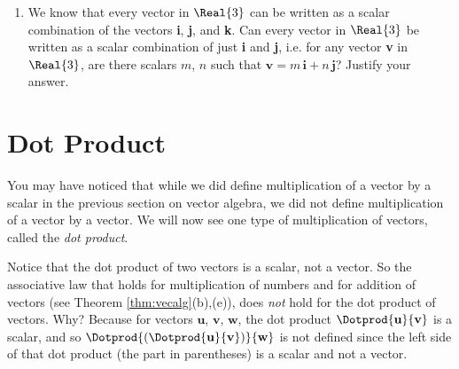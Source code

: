 \begin{enumerate}[\bfseries 1.]
[{[\bfseries 1.]}]
 \item We know that every vector in $\Real{3}$ can be written as a scalar combination of the vectors \textbf{i},
 \textbf{j}, and \textbf{k}. Can every vector in $\Real{3}$ be written as a scalar combination of just \textbf{i} and
 \textbf{j}, i.e. for any vector \textbf{v} in $\Real{3}$, are there scalars $m$, $n$ such that $\textbf{v} =
 m\,\textbf{i} + n\,\textbf{j}$? Justify your answer.
\end{enumerate}
\newpage
\section{Dot Product}
You may have noticed that while we did define multiplication of a vector by a scalar in the previous section on
vector algebra, we did not define multiplication of a vector by a vector. We will now see one type of
multiplication of vectors, called the \emph{dot product}.


Notice that the dot product of two vectors is a scalar, not a vector. 
So the associative law that holds for multiplication of numbers and for addition of vectors (see
Theorem \ref{thm:vecalg}(b),(e)), does \emph{not} hold for the dot product of vectors. Why? Because for vectors
$\textbf{u}$, $\textbf{v}$, $\textbf{w}$, the dot product $\Dotprod{\textbf{u}}{\textbf{v}}$ is a scalar, and so
$\Dotprod{(\Dotprod{\textbf{u}}{\textbf{v}})}{\textbf{w}}$ is not defined since the left side of that dot product
(the part in parentheses) is a scalar and not a vector.

